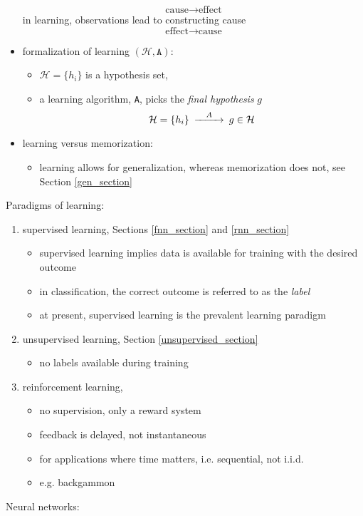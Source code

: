 \documentclass[onecolumn]{IEEEtran}
\newcommand{\beq}{\begin{equation}}
\newcommand{\eeq}{\end{equation}}
\newcommand{\bi}{\begin{itemize}}
\newcommand{\ei}{\end{itemize}}
\begin{document}
\begin{itemize}
        \beq
            \text{cause}  \rightarrow   \text{effect}
        \eeq
        in learning, observations lead to constructing cause
        \beq
            \text{effect} \rightarrow \text{cause}
        \eeq
        \item formalization of learning $(\mathcal{H},\texttt{A})$:
        \bi
            \item $\mathcal{H}=\{h_i\}$ is a hypothesis set,
            \item a learning algorithm, \texttt{A}, picks the \emph{final hypothesis} $g$
            \beq\label{hypotheses}\begin{CD}
                \mathcal{H}=\{h_i\}  @>A>>  g \in \mathcal{H}
            \end{CD}\eeq
        \ei
        \item learning versus memorization:
        \bi
            \item learning allows for generalization, whereas memorization does not, see Section \ref{gen_section}
        \ei
    \ei
    \item Paradigms of learning:
    \begin{enumerate}
        \item supervised learning, Sections \ref{fnn_section} and \ref{rnn_section}
        \bi
            \item supervised learning implies data is available for training with the desired outcome
            \item in classification, the correct outcome is referred to as the \emph{label}
            \item at present, supervised learning is the prevalent learning paradigm
        \ei
        \item unsupervised learning, Section \ref{unsupervised_section}
        \bi
            \item no labels available during training
        \ei
        \item reinforcement learning,
        \bi
            \item no supervision, only a reward system
            \item feedback is delayed, not instantaneous
            \item for applications where time matters, i.e. sequential, not i.i.d.
            \item e.g. backgammon
        \ei
    \end{enumerate}
    \item Neural networks:
    \bi

\end{itemize}
\end{document}
